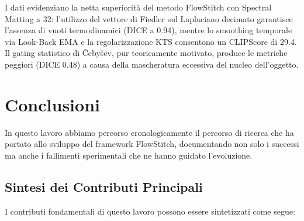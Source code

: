 \documentclass[12pt,a4paper]{report}
\begin{document}
I dati evidenziano la netta superiorità del metodo FlowStitch con Spectral Matting a 32: l'utilizzo del vettore di Fiedler sul Laplaciano decimato garantisce l'assenza di vuoti termodinamici (DICE a 0.94), mentre lo smoothing temporale via Look-Back EMA e la regolarizzazione KTS consentono un CLIPScore di 29.4. Il gating statistico di \v{C}eby\v{s}\"ev, pur teoricamente motivato, produce le metriche peggiori (DICE 0.48) a causa della mascheratura eccessiva del nucleo dell'oggetto.

\chapter{Conclusioni}

In questo lavoro abbiamo percorso cronologicamente il percorso di ricerca che ha portato allo sviluppo del framework FlowStitch, documentando non solo i successi ma anche i fallimenti sperimentali che ne hanno guidato l'evoluzione.

\section{Sintesi dei Contributi Principali}

I contributi fondamentali di questo lavoro possono essere sintetizzati come segue:
\end{document}
